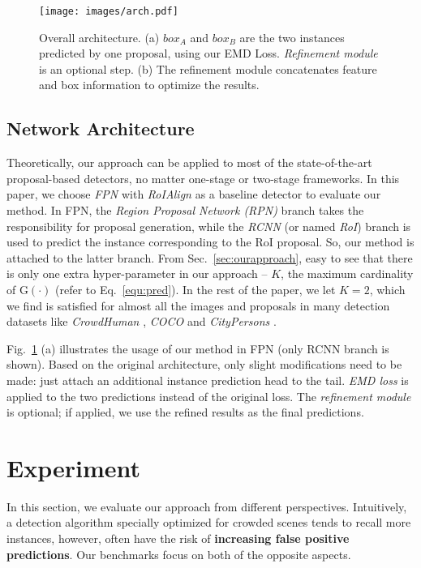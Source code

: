 \documentclass[10pt,twocolumn,letterpaper]{article}
\begin{document}
\begin{figure}[t]
\begin{center}
 \texttt{[image: images/arch.pdf]}
\end{center}
   \caption{Overall architecture. (a) $box_A$ and $box_B$ are the two instances predicted by one proposal, using our EMD Loss. \emph{Refinement module} is an optional step. (b) The refinement module concatenates feature and box information to optimize the results.}
\label{fig:arch}
\end{figure}

\subsection{Network Architecture}
\label{sec:arch}
Theoretically, our approach can be applied to most of the state-of-the-art proposal-based detectors, no matter one-stage \cite{liu2016ssd,lin2017focal,yolov3} or two-stage \cite{ren2015faster,lin2017feature,he2017mask} frameworks.  In this paper, we choose \emph{FPN} \cite{lin2017feature} with \emph{RoIAlign} \cite{he2017mask} as a baseline detector to evaluate our method. In FPN, the \emph{Region Proposal Network (RPN)} branch takes the responsibility for proposal generation, while the \emph{RCNN} (or named \emph{RoI}) branch is used to predict the instance corresponding to the RoI proposal. So, our method is attached to the latter branch. From Sec.~\ref{sec:ourapproach}, easy to see that there is only one extra hyper-parameter in our approach -- $K$, the maximum cardinality of $\mathrm{G}(\cdot)$ (refer to Eq.~\ref{equ:pred}). In the rest of the paper, we let $K=2$, which we find is satisfied for almost all the images and proposals in many detection datasets like \emph{CrowdHuman} \cite{shao2018crowdhuman}, \emph{COCO} \cite{lin2014microsoft} and \emph{CityPersons} \cite{zhang2017citypersons}.

Fig.~\ref{fig:arch} (a) illustrates the usage of our method in FPN (only RCNN branch is shown). Based on the original architecture, only slight modifications need to be made: just attach an additional instance prediction head to the tail. \emph{EMD loss} is applied to the two predictions instead of the original loss. The \emph{refinement module} is optional; if applied, we use the refined results as the final predictions.

\section{Experiment}
\label{sec:exp}
In this section, we evaluate our approach from different perspectives. Intuitively, a detection algorithm specially optimized for crowded scenes tends to recall more instances, however, often have the risk of \textbf{increasing false positive predictions}. Our benchmarks focus on both of the opposite aspects. 
\end{document}
